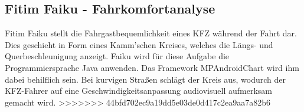 	\subsection{Fitim Faiku - Fahrkomfortanalyse}
	 Fitim Faiku stellt die Fahrgastbequemlichkeit eines KFZ während der Fahrt dar.
	 Dies geschieht in Form eines Kamm'schen Kreises, welches die Längs- und Querbeschleunigung anzeigt.
	 Faiku wird für diese Aufgabe die Programmiersprache Java anwenden.
	 Das Framework MPAndroidChart wird ihm dabei behilflich sein.
	 Bei kurvigen Straßen schlägt der Kreis aus, wodurch der KFZ-Fahrer auf eine Geschwindigkeitsanpassung 
	 audiovisuell aufmerksam gemacht wird.
>>>>>>> 44bfd702ec9a19dd5e03de0d417c2ea9aa7a82b6
